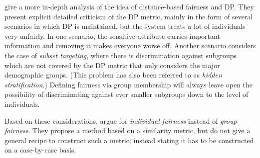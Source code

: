 \citet{dwork2012fairness} give a more in-depth analysis
of the idea of distance-based fairness and \ac{DP}.
They present explicit detailed criticism of the \ac{DP} metric,
mainly in the form of several scenarios in which \ac{DP} is maintained,
but the system treats a lot of individuals very unfairly.
In one scenario, the sensitive attribute carries important information
and removing it makes everyone worse off.
Another scenario considers the case of \emph{subset targeting},
where there is discrimination against subgroups
which are not covered by the \ac{DP} metric
that only considers the major demographic groups.
(This problem has also been referred to as \emph{hidden stratification}.)
Defining fairness via group membership will always leave open the possibility
of discriminating against ever smaller subgroups down to the level  of individuals.

Based on these considerations, \citet{dwork2012fairness} argue for
\emph{individual fairness} instead of \emph{group fairness}.
They propose a method based on a similarity metric,
but do not give a general recipe to construct such a metric;
instead stating it has to be constructed on a case-by-case basis.


